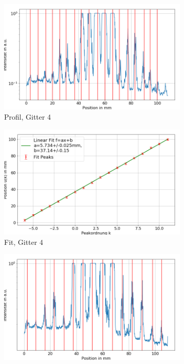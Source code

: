 \documentclass[
	a4paper,
	12pt,
	pagesize,
	ngerman
]{scrartcl}
\begin{document}
	\begin{figure}[H]\ContinuedFloat
        \centering

				\begin{subfigure}[b]{0.475\textwidth}
            \centering
            \includegraphics[width=\textwidth]{img/2/2_gitter_g4}
            \caption%
            {Profil, Gitter 4}
            \label{fig_2_profil_g4}
        \end{subfigure}
        \hfill
        \begin{subfigure}[b]{0.475\textwidth}
            \centering
            \includegraphics[width=\textwidth]{img/2/2_gitter_g4_fit}
            \caption[]%
            {Fit, Gitter 4}
            \label{fig_2_fit_g4}
        \end{subfigure}
        \begin{subfigure}[b]{0.475\textwidth}
            \centering
            \includegraphics[width=\textwidth]{img/2/2_gitter_g5}

\end{subfigure}
\end{figure}
\end{document}
